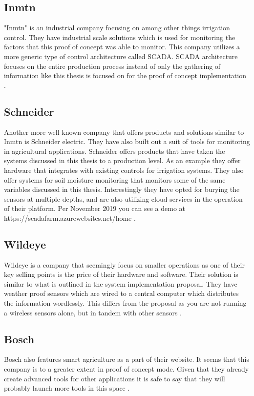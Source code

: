 \documentclass[]{uiophd}
\begin{document}
\subsection{Inmtn}
"Inmtn" is an industrial company focusing on among other things irrigation control. They have industrial scale solutions which is used for monitoring the factors that this proof of concept was able to monitor. This company utilizes a more generic type of control architecture called SCADA.  SCADA architecture focuses on the entire production process instead of only the gathering of information like this thesis is focused on for the proof of concept implementation \cite{inmtn}.

\subsection{Schneider}
Another more well known company that offers products and solutions similar to Inmtn is Schneider electric. They have also built out a suit of tools for monitoring in agricultural applications. Schneider offers products that have taken the systems discussed in this thesis to a production level. As an example they offer hardware that integrates with existing controls for irrigation systems. They also offer systems for soil moisture monitoring that monitors some of the same variables discussed in this thesis. Interestingly they have opted for burying the sensors at multiple depths, and are also utilizing cloud services in the operation of their platform. Per November 2019 you can see a demo at https://scadafarm.azurewebsites.net/home \cite{Schneider}. 

\subsection{Wildeye}
Wildeye is a company that seemingly focus on smaller operations as one of their key selling points is the price of their hardware and software. Their solution is similar to what is outlined in the system implementation proposal. They have weather proof sensors which are wired to a central computer which distributes the information wordlessly. This differs from the proposal as you are not running a wireless sensors alone, but in tandem with other sensors \cite{wildeye}.

\subsection{Bosch}
Bosch also features smart agriculture as a part of their website. It seems that this company is to a greater extent in proof of concept mode. Given that they already create advanced tools for other applications it is safe to say that they will probably launch more tools in this space \cite{Bosch}.
\end{document}
